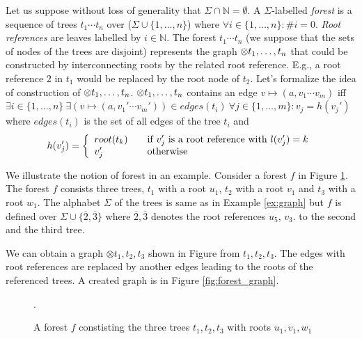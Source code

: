 Let us suppose without loss of generality that $\Sigma \cap \mathbb{N} = \emptyset$.
A $\Sigma$-labelled \emph{forest} is a sequence of trees $t_1 \cdots t_n$ over ($\Sigma \cup \{1,\ldots,n\}$)
where $\forall i \in \{1,\ldots,n\}: \#i = 0$.
\emph{Root references} are leaves labelled by $i \in \mathbb{N}$.
The forest $t_1 \cdots t_n$ (we suppose that the sets of nodes of the trees are disjoint) represents the graph $\otimes t_1, \ldots, t_n$ that could
be constructed by interconnecting roots by the related root reference.
E.g., a root reference $2$ in $t_1$ would be replaced by the root node of $t_2$.
Let's formalize the idea of construction of $\otimes t_1, \ldots, t_n$.
$\otimes t_1, \ldots, t_n$ contains an edge $v \mapsto (a,v_1 \cdots v_m)$ iff $\exists i \in \{1, \ldots, n\} \ \exists(v \mapsto (a, v_1' \cdots v_m')) \in edges(t_i)
\ \forall j \in \{1,\ldots,m\}: v_j = h(v_j')$ where $edges(t_i)$ is the set of all edges of the tree $t_i$ and
\[ h(v_j') = \left\{
  \begin{array}{l l}
  root(t_k) & \quad \text{if $v_j'$ is a root reference with $l(v_j') = k$}\\
  v_j'   & \quad \text{otherwise}
  \end{array} \right.\]

\pagebreak
\bexmp
We illustrate the notion of forest in an example.
Consider a forest $f$ in Figure \ref{fig:forest}.
The forest $f$ consists three trees, $t_1$ with a root $u_1$,
$t_2$ with a root $v_1$ and $t_3$ with a root $w_1$.
The alphabet $\Sigma$ of the trees is same as in Example \ref{ex:graph} but $f$
is defined over $\Sigma \cup \{\overline{2}, \overline{3}\}$
where $\overline{2}, \overline{3}$ denotes the root references $u_5$, $v_3$.
to the second and the third tree.

We can obtain a graph $\otimes t_1,t_2,t_3$ shown in Figure from $t_1, t_2, t_3$.
The edges with root references are replaced by another edges leading to the roots
of the referenced trees.
A created graph is in Figure \ref{fig:forest_graph}.

	\begin{figure}[bth]
	\begin{center}
		\scalebox{1}
		{
			
			\hspace{0.55cm}
			
			\hspace{0.55cm}
			
		}
		\caption{A forest $f$ constisting the three trees $t_1, t_2, t_3$ with roots $u_1, v_1, w_1$}.
	  \label{fig:forest}
	\end{center}
	\end{figure}

